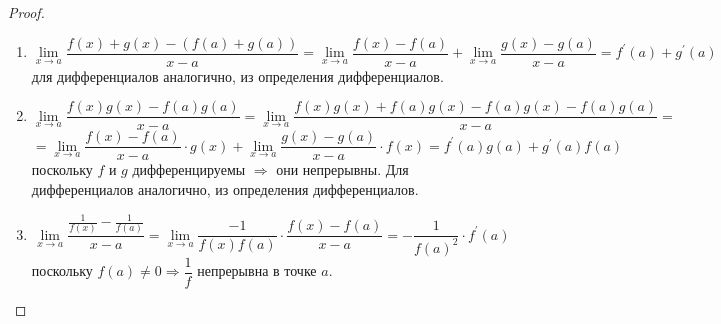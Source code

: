 \documentclass[12pt]{article}
\theoremstyle{definition}
\begin{document}
\begin{proof}\hfill
	\begin{enumerate}[label={\arabic*)}]
		\item $$\lim\limits_{x \to a}\dfrac{f(x) + g(x) - (f(a) + g(a))}{x-a} =\lim\limits_{x \to a}\dfrac{f(x) - f(a)}{x-a} + \lim\limits_{x \to a}\dfrac{g(x) -  g(a)}{x-a} = f^\prime(a) + g^\prime(a)$$
		для дифференциалов аналогично, из определения дифференциалов.
		\item $$\lim\limits_{x \to a}\dfrac{f(x)g(x) - f(a)g(a)}{x-a} = \lim\limits_{x \to a}\dfrac{f(x)g(x) + f(a)g(x) - f(a)g(x) - f(a)g(a)}{x-a} =$$
		$$ =\lim\limits_{x \to a}\dfrac{f(x) - f(a)}{x-a}{\cdot}g(x) + \lim\limits_{x \to a}\dfrac{g(x) -  g(a)}{x-a}{\cdot}f(x) = f^\prime(a)g(a) + g^\prime(a)f(a)$$ поскольку $f$ и $g$ дифференцируемы $\Rightarrow$ они непрерывны. Для дифференциалов аналогично, из определения дифференциалов.
		\item  $$\lim\limits_{x \to a}\dfrac{\frac{1}{f(x)} - \frac{1}{f(a)}}{x-a} = \lim\limits_{x \to a}\dfrac{-1}{f(x)f(a)}{\cdot}\dfrac{f(x) - f(a)}{x-a} = -\dfrac{1}{f(a)^2}{\cdot}f^\prime(a)$$
		поскольку $f(a) \neq 0 \Rightarrow \dfrac{1}{f}$ непрерывна в точке $a$.
	\end{enumerate}
\end{proof}
\end{document}
